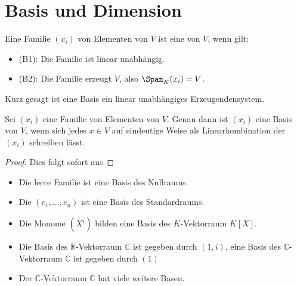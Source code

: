 \section{Basis und Dimension}

\begin{definition}[Basis]
	Eine Familie $(x_i)$ von Elementen von $V$ ist eine  von $V$, wenn gilt:
	\begin{itemize}
		\item (B1): Die Familie ist linear unabhängig.
		\item (B2): Die Familie erzeugt $V$, also $\Span_K(x_i) = V$.
	\end{itemize}
\end{definition}

\begin{remark}
	Kurz gesagt ist eine Basis ein linear unabhängiges Erzeugendensystem.
\end{remark}

\begin{proposition}
	Sei $(x_i)$ eine Familie von Elementen von $V$. Genau dann ist $(x_i)$ eine Basis von $V$, 
	wenn sich jedes $x \in V$ auf eindeutige Weise als Linearkombination der $(x_i)$ schreiben lässt.
\end{proposition}
\begin{proof}
	Dies folgt sofort aus 
\end{proof}

\begin{example}
	\begin{itemize}
		\item Die leere Familie ist eine Basis des Nullraums.
		\item Die  $(e_1,...,e_n)$ ist eine Basis des Standardraums.
		\item Die Monome $(X^i)$ bilden eine Basis des $K$-Vektorraum $K[X]$.
		\item Die Basis des $\mathbb R$-Vektorraum $\mathbb C$ ist gegeben durch $(1,i)$, eine Basis des $\mathbb C$-
		Vektorraum $\mathbb C$ ist gegeben durch $(1)$
		\item Der $\mathbb C$-Vektorraum $\mathbb C$ hat viele weitere Basen.
	\end{itemize}
\end{example}


